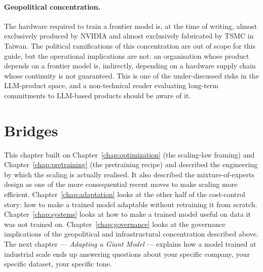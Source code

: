 \paragraph{Geopolitical concentration.} The hardware required
to train a frontier model is, at the time of writing, almost
exclusively produced by NVIDIA and almost exclusively
fabricated by TSMC in Taiwan. The political ramifications of
this concentration are out of scope for this guide, but the
operational implications are not: an organisation whose product
depends on a frontier model is, indirectly, depending on a
hardware supply chain whose continuity is not guaranteed. This
is one of the under-discussed risks in the LLM-product space,
and a non-technical reader evaluating long-term commitments to
LLM-based products should be aware of it.

\section*{Bridges}

This chapter built on Chapter~\ref{chap:optimization} (the scaling-law framing) and
Chapter~\ref{chap:pretraining} (the pretraining recipe) and described the
engineering by which the scaling is actually realised. It also
described the mixture-of-experts design as one of the more
consequential recent moves to make scaling more efficient.
Chapter~\ref{chap:adaptation} looks at the other half of the cost-control story:
how to make a trained model adaptable without retraining it
from scratch. Chapter~\ref{chap:systems} looks at how to make a trained model
useful on data it was not trained on. Chapter~\ref{chap:governance} looks at the
governance implications of the geopolitical and infrastructural
concentration described above. The next chapter --- \emph{Adapting
a Giant Model} --- explains how a model trained at industrial
scale ends up answering questions about your specific company,
your specific dataset, your specific tone.
